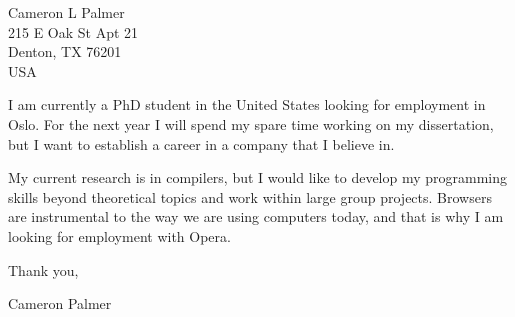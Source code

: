 \documentclass[12pt,twoside,letterpaper]{article}
\begin{document}
Cameron L Palmer \\
215 E Oak St Apt 21 \\
Denton, TX 76201 \\
USA

I am currently a PhD student in the United States looking for employment in Oslo. For the next year I will spend my spare time working on my dissertation, but I want to establish a career in a company that I believe in.

My current research is in compilers, but I would like to develop my programming skills beyond theoretical topics and work within large group projects. Browsers are instrumental to the way we are using computers today, and that is why I am looking for employment with Opera.

Thank you,

Cameron Palmer
\end{document}
